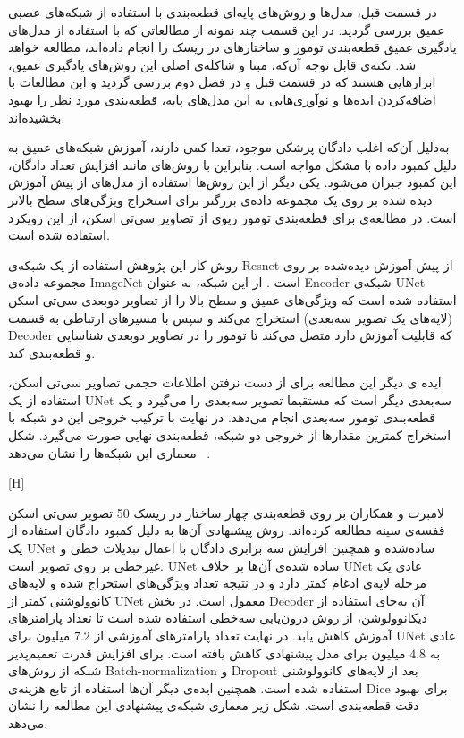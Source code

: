 در قسمت قبل، مدل‌ها و روش‌های پایه‌ای قطعه‌بندی با استفاده از شبکه‌های عصبی عمیق بررسی گردید. در این قسمت چند نمونه از مطالعاتی که با استفاده از مدل‌های یادگیری عمیق قطعه‌بندی تومور و ساختارهای در ریسک را انجام داده‌اند، مطالعه خواهد شد. نکته‌ی قابل توجه آن‌که، مبنا و شاکله‌ی اصلی این روش‌های یادگیری عمیق، ابزارهایی هستند که در قسمت قبل و در فصل دوم بررسی گردید و ابن مطالعات با اضافه‌کردن ایده‌ها و نوآوری‌هایی به این مدل‌های پایه، قطعه‌بندی مورد نظر را بهبود بخشیده‌اند.

به‌دلیل آن‌که اغلب دادگان پزشکی موجود، تعدا کمی دارند، آموزش شبکه‌های عمیق به دلیل کمبود داده با مشکل مواجه است. بنابراین با روش‌های مانند افزایش تعداد دادگان، این کمبود جبران می‌شود. یکی دیگر از این روش‌ها استفاده از مدل‌های از پیش آموزش دیده شده بر روی یک مجموعه‌ داده‌ی بزرگتر برای استخراج ویژگی‌های سطح بالاتر است. در مطالعه‌ی  برای قطعه‌بندی تومور ریوی از تصاویر سی‌تی اسکن، از این رویکرد استفاده شده است.

روش کار این پژوهش استفاده از یک شبکه‌ی Resnet از پیش آموزش دیده‌شده بر روی مجموعه داده‌ی ImageNet است . از این شبکه، به عنوان Encoder شبکه‌ی UNet استفاده شده است که ویژگی‌های عمیق و سطح بالا را از تصاویر دوبعدی سی‌تی اسکن (لایه‌های یک تصویر سه‌بعدی) استخراج می‌کند و سپس با مسیرهای ارتباطی به قسمت Decoder که قابلیت آموزش دارد متصل می‌کند تا تومور را در تصاویر دوبعدی شناسایی و قطعه‌بندی کند. 

ایده ی دیگر این مطالعه برای از دست نرفتن اطلاعات حجمی تصاویر سی‌تی اسکن، استفاده از یک UNet سه‌بعدی دیگر است که مستقیما تصویر سه‌بعدی را می‌گیرد و یک قطعه‌بندی تومور سه‌بعدی انجام می‌دهد. در نهایت با ترکیب خروجی این دو شبکه با استخراج کمترین مقدار‌ها از خروجی دو شبکه، قطعه‌بندی نهایی صورت می‌گیرد. شکل ~ معماری این شبکه‌ها را نشان‌ می‌دهد.

[H]

لامبرت و همکاران  بر روی قطعه‌بندی چهار ساختار در ریسک 50 تصویر سی‌تی اسکن  قفسه‌ی سینه مطالعه کرده‌اند. روش پیشنهادی آن‌ها به دلیل کمبود دادگان استفاده از یک UNet ساده‌شده و همچنین افزایش سه برابری دادگان با اعمال تبدیلات خطی و غیرخطی بر روی تصویر است. UNet ساده شده‌ی آن‌ها بر خلاف UNet عادی یک مرحله لایه‌ی ادغام کمتر دارد و در نتیجه تعداد ویژگی‌های استخراج شده و لایه‌های کانوولوشنی کمتر از UNet معمول است. در بخش Decoder آن به‌جای استفاده از دیکانوولوشن، از روش درون‌یابی سه‌خطی استفاده شده است تا تعداد پارامتر‌های آموزش کاهش یابد.  در نهایت تعداد پارامترهای آموزشی از $7.2$ میلیون برای UNet عادی به $4.8$ میلیون برای مدل پیشنهادی کاهش یافته است. برای افزایش قدرت تعمیم‌پذیر شبکه از روش‌های Batch-normalization و Dropout بعد از لایه‌های کانوولوشنی استفاده شده است. همچنین ایده‌ی دیگر آن‌ها استفاده از تابع هزینه‌ی Dice برای بهبود دقت قطعه‌بندی است. شکل زیر معماری شبکه‌ی پیشنهادی این مطالعه را نشان می‌دهد.

